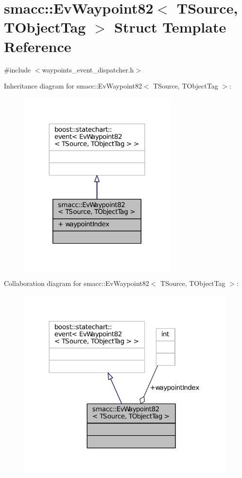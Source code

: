 \hypertarget{structsmacc_1_1EvWaypoint82}{}\section{smacc\+:\+:Ev\+Waypoint82$<$ T\+Source, T\+Object\+Tag $>$ Struct Template Reference}
\label{structsmacc_1_1EvWaypoint82}


{\ttfamily \#include $<$waypoints\+\_\+event\+\_\+dispatcher.\+h$>$}



Inheritance diagram for smacc\+:\+:Ev\+Waypoint82$<$ T\+Source, T\+Object\+Tag $>$\+:
\nopagebreak
\begin{figure}[H]
\begin{center}
\leavevmode
\includegraphics[width=227pt]{structsmacc_1_1EvWaypoint82__inherit__graph}
\end{center}
\end{figure}


Collaboration diagram for smacc\+:\+:Ev\+Waypoint82$<$ T\+Source, T\+Object\+Tag $>$\+:
\nopagebreak
\begin{figure}[H]
\begin{center}
\leavevmode
\includegraphics[width=312pt]{structsmacc_1_1EvWaypoint82__coll__graph}
\end{center}
\end{figure}
